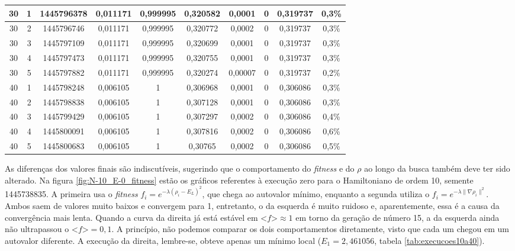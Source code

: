 \begin{landscape}
\begin{center}
\begin{table}[htbp]
\begin{tabular}{cccccccccc}
\hline
        30 &          1 & 1445796378 &   0,011171 &   0,999995 &   0,320582 &     0,0001 &          0 &   0,319737 &      0,3\% \\
\hline
        30 &          2 & 1445796746 &   0,011171 &   0,999995 &   0,320772 &     0,0002 &          0 &   0,319737 &      0,3\% \\
\hline
        30 &          3 & 1445797109 &   0,011171 &   0,999995 &   0,320699 &     0,0001 &          0 &   0,319737 &      0,3\% \\
\hline
        30 &          4 & 1445797473 &   0,011171 &   0,999995 &   0,320755 &     0,0001 &          0 &   0,319737 &      0,3\% \\
\hline
        30 &          5 & 1445797882 &   0,011171 &   0,999995 &   0,320274 &    0,00007 &          0 &   0,319737 &      0,2\% \\
\hline
        40 &          1 & 1445798248 &   0,006105 &          1 &   0,306968 &     0,0001 &          0 &   0,306086 &      0,3\% \\
\hline
        40 &          2 & 1445798838 &   0,006105 &          1 &   0,307128 &     0,0001 &          0 &   0,306086 &      0,3\% \\
\hline
        40 &          3 & 1445799429 &   0,006105 &          1 &   0,307297 &     0,0002 &          0 &   0,306086 &      0,4\% \\
\hline
        40 &          4 & 1445800091 &   0,006105 &          1 &   0,307816 &     0,0002 &          0 &   0,306086 &      0,6\% \\
\hline
        40 &          5 & 1445800683 &   0,006105 &          1 &    0,30765 &     0,0002 &          0 &   0,306086 &      0,5\% \\

\hline \hline
\end{tabular}
\end{table}  
\end{center}
\end{landscape}
	
	As diferenças dos valores finais são indiscutíveis, sugerindo que o comportamento do \textit{fitness} e do $\rho$ ao longo da busca também deve ter sido alterado. Na figura \ref{fig:N-10_E-0_fitness} estão os gráficos referentes à execução zero para o Hamiltoniano de ordem 10, semente 1445738835. A primeira usa o \textit{fitness} $f_i = e^{-\lambda(\rho_i - E_L)^2}$, que chega ao autovalor mínimo, enquanto a segunda utiliza o $f_i = e^{-\lambda \| \nabla \rho_i \|^2}$. Ambos saem de valores muito baixos e convergem para 1, entretanto, o da esquerda é muito ruidoso e, aparentemente, essa é a causa da convergência mais lenta. Quando a curva da direita já está estável em $\textit{<f>} \approx 1$ em torno da geração de número 15, a da esquerda ainda não ultrapassou o $\textit{<f>} = 0,1$. A princípio, não podemos comparar os dois comportamentos diretamente, visto que cada um chegou em um autovalor diferente. A execução da direita, lembre-se, obteve apenas um mínimo local ($E_1 = 2,461056$, tabela \ref{tab:execucoes10a40}).
	
